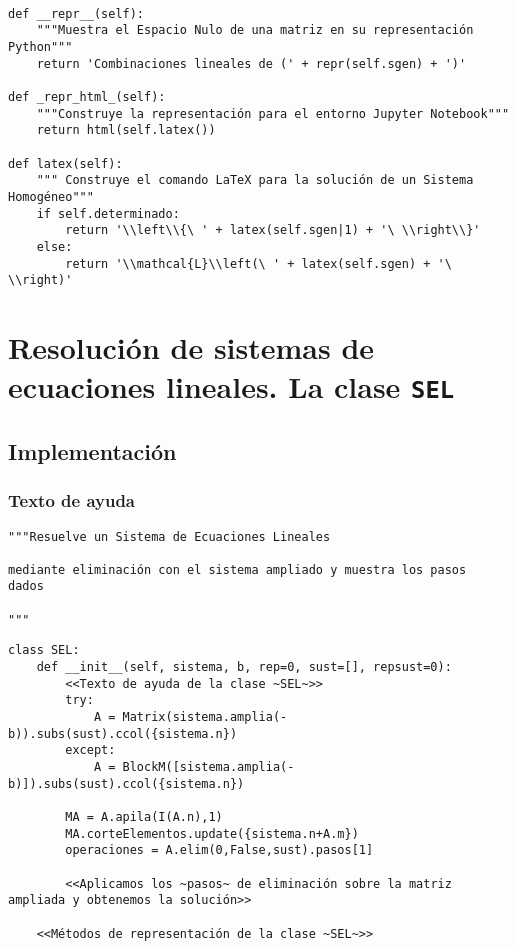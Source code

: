 \documentclass[11pt]{report}
\begin{document}
\begin{verbatim}

def __repr__(self):
    """Muestra el Espacio Nulo de una matriz en su representación Python"""
    return 'Combinaciones lineales de (' + repr(self.sgen) + ')'

def _repr_html_(self):
    """Construye la representación para el entorno Jupyter Notebook"""
    return html(self.latex())

def latex(self):
    """ Construye el comando LaTeX para la solución de un Sistema Homogéneo"""
    if self.determinado:
        return '\\left\\{\ ' + latex(self.sgen|1) + '\ \\right\\}'
    else:
        return '\\mathcal{L}\\left(\ ' + latex(self.sgen) + '\ \\right)' 

\end{verbatim}


\chapter{Resolución de sistemas de ecuaciones lineales. La clase  \texttt{SEL}}
\label{sec:org848b311}

\section{Implementación}
\label{sec:org2c6ac2b}
\subsection{Texto de ayuda}
\label{sec:orge34302e}

\begin{verbatim}
"""Resuelve un Sistema de Ecuaciones Lineales

mediante eliminación con el sistema ampliado y muestra los pasos
dados

"""
\end{verbatim}

\begin{verbatim}
class SEL:
    def __init__(self, sistema, b, rep=0, sust=[], repsust=0):
        <<Texto de ayuda de la clase ~SEL~>>
        try:
            A = Matrix(sistema.amplia(-b)).subs(sust).ccol({sistema.n})
        except:
            A = BlockM([sistema.amplia(-b)]).subs(sust).ccol({sistema.n})
            
        MA = A.apila(I(A.n),1)
        MA.corteElementos.update({sistema.n+A.m})
        operaciones = A.elim(0,False,sust).pasos[1]
        
        <<Aplicamos los ~pasos~ de eliminación sobre la matriz ampliada y obtenemos la solución>>
        
    <<Métodos de representación de la clase ~SEL~>>
    
\end{verbatim}
\end{document}
